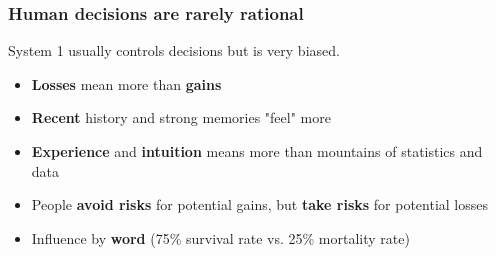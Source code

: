 \documentclass{beamer}
\begin{document}
\begin{frame}
	\frametitle{Human decisions are rarely rational}
	System 1 usually controls decisions but is very biased.
	\begin{itemize}
		\item \textbf{Losses} mean more than \textbf{gains}
		\item \textbf{Recent} history and strong memories "feel" more
		\item \textbf{Experience} and \textbf{intuition} means more than mountains of statistics and data
		\item People \textbf{avoid risks} for potential gains, but \textbf{take risks} for potential losses
		\item Influence by \textbf{word} (75\% survival rate vs. 25\% mortality rate)
	\end{itemize}
\end{frame}

\end{document}
